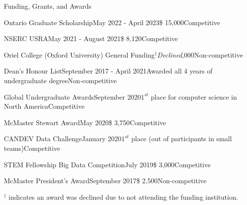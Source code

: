 \begin{rSection}{Funding, Grants, and Awards} 

\begin{aSubsection}{Ontario Graduate Scholarship}{May 2022 - April 2023}{\$ 15,000}{Competitive}
\end{aSubsection}

\begin{aSubsection}{NSERC USRA}{May 2021 - August 2021}{\$ 8,120}{Competitive}
\end{aSubsection}

\begin{aSubsection}{Oriel College (Oxford University) General Funding}{$^\dagger$\emph{Declined}}{,000}{Non-competitive}
\end{aSubsection}

\begin{aSubsection}{Dean's Honour List}{September 2017 - April 2021}{Awarded all 4 years of undergraduate degree}{Non-competitive}
\end{aSubsection}

\begin{aSubsection}{Global Undergraduate Awards}{September 2020}{$1^{st}$ place for computer science in North America}{Competitive}
\end{aSubsection}

\begin{aSubsection}{McMaster Stewart Award}{May 2020}{\$ 3,750}{Competitive}
\end{aSubsection}

\begin{aSubsection}{CANDEV Data Challenge}{January 2020}{$1^{st}$ place (out of  participants in small teams)}{Competitive}
\end{aSubsection}

\begin{aSubsection}{STEM Fellowship Big Data Competition}{July 2019}{\$ 3,000}{Competitive}
\end{aSubsection}

\begin{aSubsection}{McMaster President's Award}{September 2017}{\$ 2,500}{Non-competitive}
\end{aSubsection}

\smallskip
$^\dagger$ indicates an award was declined due to not attending the funding institution.

\end{rSection}

